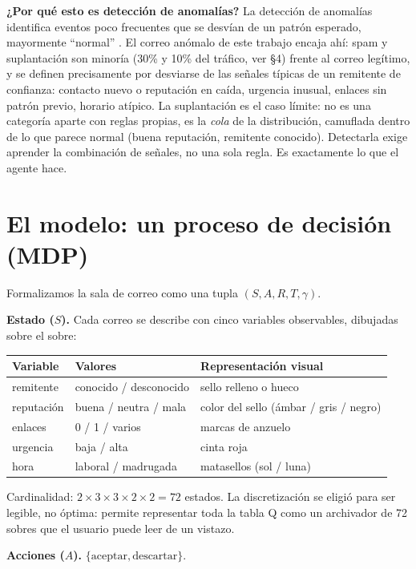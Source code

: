 \documentclass[11pt]{article}
\begin{document}
\textbf{¿Por qué esto es detección de anomalías?} La detección de anomalías
identifica eventos poco frecuentes que se desvían de un patrón esperado,
mayormente ``normal'' \cite{pang2021}. El correo anómalo de este trabajo
encaja ahí: spam y suplantación son minoría (30\% y 10\% del tráfico, ver
\S4) frente al correo legítimo, y se definen precisamente por desviarse de
las señales típicas de un remitente de confianza: contacto nuevo o
reputación en caída, urgencia inusual, enlaces sin patrón previo, horario
atípico. La suplantación es el caso límite: no es una categoría aparte con
reglas propias, es la \textit{cola} de la distribución, camuflada dentro de
lo que parece normal (buena reputación, remitente conocido). Detectarla
exige aprender la combinación de señales, no una sola regla. Es exactamente
lo que el agente hace.

\section{El modelo: un proceso de decisión (MDP)}

Formalizamos la sala de correo como una tupla $(S, A, R, T, \gamma)$.

\textbf{Estado ($S$).} Cada correo se describe con cinco variables
observables, dibujadas sobre el sobre:

\begin{center}
\begin{tabular}{@{}lll@{}}
\toprule
\textbf{Variable} & \textbf{Valores} & \textbf{Representación visual} \\
\midrule
remitente & conocido / desconocido & sello relleno o hueco \\
reputación & buena / neutra / mala & color del sello (ámbar / gris / negro) \\
enlaces & 0 / 1 / varios & marcas de anzuelo \\
urgencia & baja / alta & cinta roja \\
hora & laboral / madrugada & matasellos (sol / luna) \\
\bottomrule
\end{tabular}
\end{center}

Cardinalidad: $2 \times 3 \times 3 \times 2 \times 2 = 72$ estados. La
discretización se eligió para ser legible, no óptima: permite representar
toda la tabla Q como un archivador de 72 sobres que el usuario puede leer de
un vistazo.

\textbf{Acciones ($A$).} $\{\text{aceptar}, \text{descartar}\}$.
\end{document}
